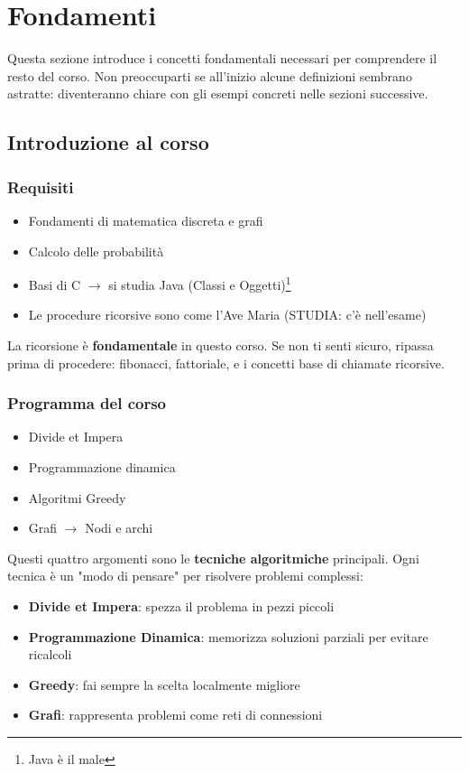 \section{Fondamenti}

\begin{softnote}
	Questa sezione introduce i concetti fondamentali necessari per comprendere il resto del corso. Non preoccuparti se all'inizio alcune definizioni sembrano astratte: diventeranno chiare con gli esempi concreti nelle sezioni successive.
\end{softnote}

\subsection{Introduzione al corso}

\subsubsection{Requisiti}
\begin{itemize}
	\item Fondamenti di matematica discreta e grafi
	\item Calcolo delle probabilità
	\item Basi di C $\to$ si studia Java (Classi e Oggetti)\footnote{Java è il male}
	\item Le procedure ricorsive sono come l'Ave Maria (STUDIA: c'è nell'esame)
\end{itemize}

\begin{nota}
	La ricorsione è \textbf{fondamentale} in questo corso. Se non ti senti sicuro, ripassa prima di procedere: fibonacci, fattoriale, e i concetti base di chiamate ricorsive.
\end{nota}

\subsubsection{Programma del corso}
\begin{itemize}
	\item Divide et Impera
	\item Programmazione dinamica
	\item Algoritmi Greedy
	\item Grafi $\to$ Nodi e archi
\end{itemize}

\begin{softnote}
	Questi quattro argomenti sono le \textbf{tecniche algoritmiche} principali. Ogni tecnica è un "modo di pensare" per risolvere problemi complessi:
	\begin{itemize}
		\item \textbf{Divide et Impera}: spezza il problema in pezzi piccoli
		\item \textbf{Programmazione Dinamica}: memorizza soluzioni parziali per evitare ricalcoli
		\item \textbf{Greedy}: fai sempre la scelta localmente migliore
		\item \textbf{Grafi}: rappresenta problemi come reti di connessioni
	\end{itemize}
\end{softnote}

